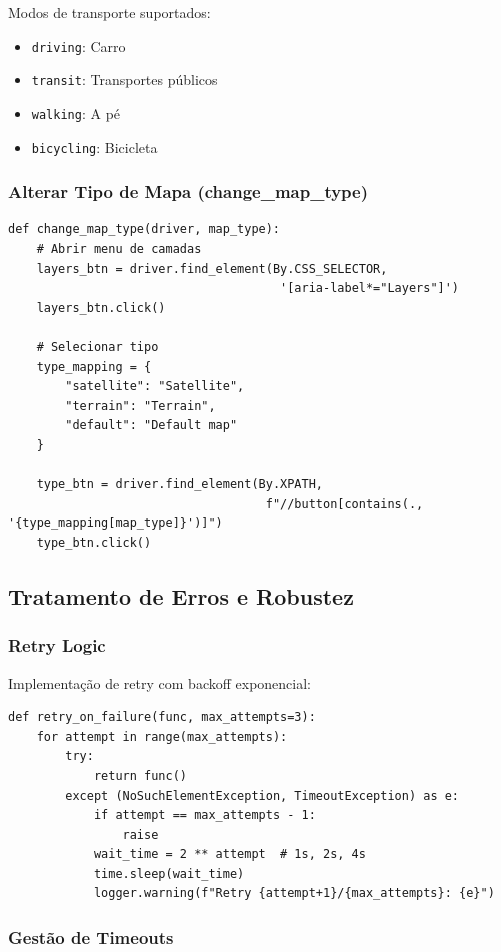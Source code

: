 Modos de transporte suportados:
\begin{itemize}
    \item \texttt{driving}: Carro
    \item \texttt{transit}: Transportes públicos
    \item \texttt{walking}: A pé
    \item \texttt{bicycling}: Bicicleta
\end{itemize}

\subsubsection{Alterar Tipo de Mapa (change\_map\_type)}

\begin{verbatim}
def change_map_type(driver, map_type):
    # Abrir menu de camadas
    layers_btn = driver.find_element(By.CSS_SELECTOR,
                                      '[aria-label*="Layers"]')
    layers_btn.click()

    # Selecionar tipo
    type_mapping = {
        "satellite": "Satellite",
        "terrain": "Terrain",
        "default": "Default map"
    }

    type_btn = driver.find_element(By.XPATH,
                                    f"//button[contains(., '{type_mapping[map_type]}')]")
    type_btn.click()
\end{verbatim}

\subsection{Tratamento de Erros e Robustez}

\subsubsection{Retry Logic}

Implementação de retry com backoff exponencial:
\begin{verbatim}
def retry_on_failure(func, max_attempts=3):
    for attempt in range(max_attempts):
        try:
            return func()
        except (NoSuchElementException, TimeoutException) as e:
            if attempt == max_attempts - 1:
                raise
            wait_time = 2 ** attempt  # 1s, 2s, 4s
            time.sleep(wait_time)
            logger.warning(f"Retry {attempt+1}/{max_attempts}: {e}")
\end{verbatim}

\subsubsection{Gestão de Timeouts}

